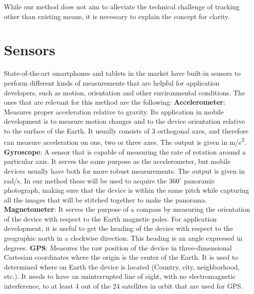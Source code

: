 While our method does not aim to alleviate the technical challenge of tracking other than existing means, it is necessary to explain the concept for clarity. 

\section{Sensors}
State-of-the-art smartphones and tablets in the market have built-in sensors to perform different kinds of measurements that are helpful for application developers, such as motion, orientation and other environmental conditions. The ones that are relevant for this method are the following:\newline
\textbf{Accelerometer}: Measures proper acceleration relative to gravity. Its application in mobile development is to measure motion changes and to the device orientation relative to the surface of the Earth. It usually consists of 3 orthogonal axes, and therefore can measure acceleration on one, two or three axes. The output is given in m/s\textsuperscript{2}. \newline
\textbf{Gyroscope}: A sensor that is capable of measuring the rate of rotation around a particular axis. It serves the same purpose as the accelerometer, but mobile devices usually have both for more robust measurements. The output is given in rad/s. In our method these will be used to acquire the $360^{\circ}$  panoramic photograph, making sure that the device is within the same pitch while capturing all the images that will be stitched together to make the panorama. \newline
\textbf{Magnetometer}: It serves the purpose of a compass by measuring the orientation of the device with respect to the Earth magnetic poles. For application development, it is useful to get the heading of the device with respect to the geographic north in a clockwise direction. This heading is an angle expressed in degrees.\newline
\textbf{GPS}: Measures the raw position of the device in three-dimensional Cartesian coordinates where the origin is the center of the Earth. It is used to determined where on Earth the device is located (Country, city, neighborhood, etc.). It needs to have an uninterrupted line of sight, with no electromagnetic interference, to at least 4 out of the 24 satellites in orbit that are used for GPS.

